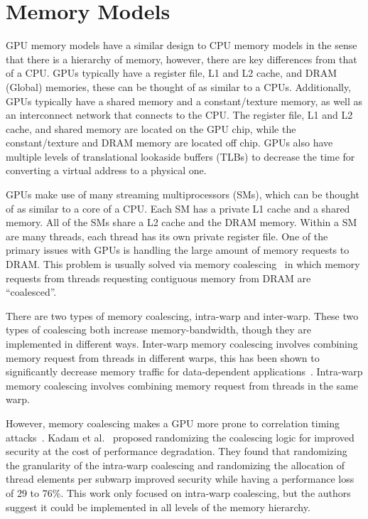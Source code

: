 \documentclass[conference]{IEEEtran}
\begin{document}
\section{Memory Models}
GPU memory models have a similar design to CPU memory models in the sense that there is a hierarchy of memory, however, there are key differences from that of a CPU.
GPUs typically have a register file, L1 and L2 cache, and DRAM (Global) memories, these can be thought of as similar to a CPUs.
Additionally, GPUs typically have a shared memory and a constant/texture memory, as well as an interconnect network that connects to the CPU.
The register file, L1 and L2 cache, and shared memory are located on the GPU chip, while the constant/texture and DRAM memory are located off chip.
GPUs also have multiple levels of translational lookaside buffers (TLBs) to decrease the time for converting a virtual address to a physical one.

GPUs make use of many streaming multiprocessors (SMs), which can be thought of as similar to a core of a CPU.
Each SM has a private L1 cache and a shared memory.
All of the SMs share a L2 cache and the DRAM memory.
Within a SM are many threads, each thread has its own private register file.
One of the primary issues with GPUs is handling the large amount of memory requests to DRAM.
This problem is usually solved via memory coalescing~\cite{Jog2013OWL, Bakhoda2009, Singh2013, Fung2011HPC, Kadam2018} in which memory requests from threads requesting contiguous memory from DRAM are ``coalesced''.

There are two types of memory coalescing, intra-warp and inter-warp.
These two types of coalescing both increase memory-bandwidth, though they are implemented in different ways.
Inter-warp memory coalescing involves combining memory request from threads in different warps, this has been shown to significantly decrease memory traffic for data-dependent applications~\cite{Bakhoda2009}.
Intra-warp memory coalescing involves combining memory request from threads in the same warp.

However, memory coalescing makes a GPU more prone to correlation timing attacks~\cite{Kadam2018}. Kadam et al.~\cite{Kadam2018} proposed randomizing the coalescing logic for improved security at the cost of performance degradation.
They found that randomizing the granularity of the intra-warp coalescing and randomizing the allocation of thread elements per subwarp improved security while having a performance loss of 29 to 76\%.
This work only focused on intra-warp coalescing, but the authors suggest it could be implemented in all levels of the memory hierarchy.
\end{document}
